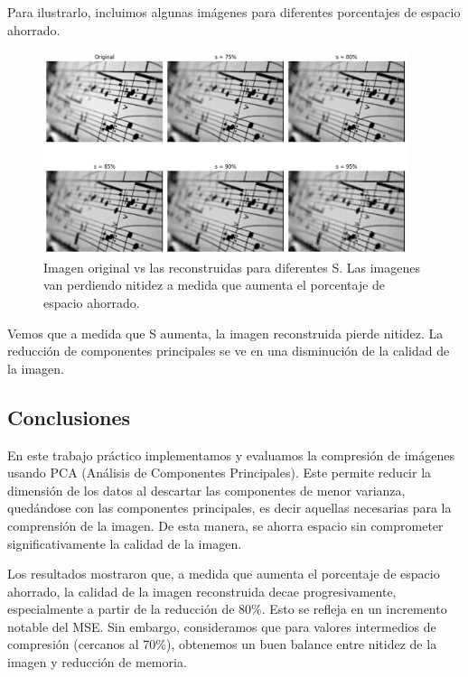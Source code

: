 \documentclass[a4paper,12pt]{article}
\begin{document}
Para ilustrarlo, incluimos algunas imágenes para diferentes porcentajes de espacio ahorrado. 
\begin{figure}[H]
    \centering
    \includegraphics[width=0.95\textwidth]{Ejercicio 4b.png}
    \caption{Imagen original vs las reconstruidas para diferentes S. Las imagenes van perdiendo nitidez a medida que aumenta el porcentaje de espacio ahorrado.}
    \label{fig:ej4b}
\end{figure}

Vemos que a medida que S aumenta, la imagen reconstruida pierde nitidez. La reducción de 
componentes principales se ve en una disminución de la calidad de la imagen. 

\newpage
\subsection*{Conclusiones}
En este trabajo práctico implementamos y evaluamos la compresión de imágenes usando 
PCA (Análisis de Componentes Principales). Este permite reducir la dimensión de los datos
al descartar las componentes de menor varianza, quedándose con las componentes principales, 
es decir aquellas necesarias para la comprensión de la imagen. De esta manera, se ahorra espacio 
sin comprometer significativamente la calidad de la imagen.

\vspace{1em}

Los resultados mostraron que, a medida que aumenta el porcentaje de espacio ahorrado, la calidad
de la imagen reconstruida decae progresivamente, especialmente a partir de la reducción de 80\%. 
Esto se refleja en un incremento notable del MSE. Sin embargo, consideramos que
para valores intermedios de compresión (cercanos al 70\%), obtenemos un buen balance entre nitidez 
de la imagen y reducción de memoria. 
\end{document}
